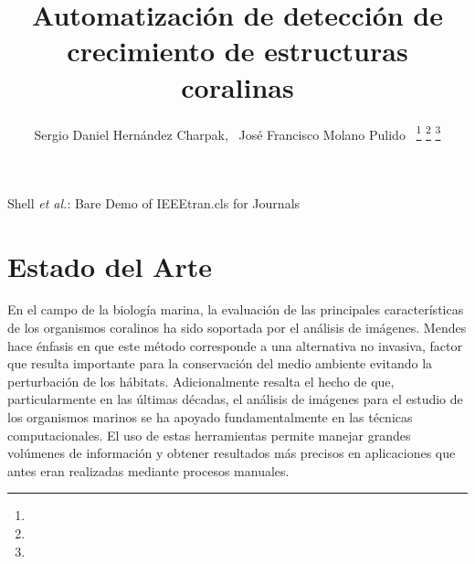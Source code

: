 \documentclass[journal]{IEEEtran}
\begin{document}
\title{Automatización de detección de crecimiento de estructuras coralinas}

\author{Sergio Daniel Hernández Charpak,~\IEEEmembership{}
        José Francisco Molano Pulido~\IEEEmembership{}%
\thanks{}%
\thanks{}%
\thanks{}}

%
{Shell \MakeLowercase{\textit{et al.}}: Bare Demo of IEEEtran.cls for Journals}

\maketitle




\IEEEpeerreviewmaketitle

\section{Estado del Arte}
En el campo de la biología marina, la evaluación de las principales características de
los organismos coralinos ha sido soportada por el análisis de imágenes. Mendes
\cite{estrellas} hace énfasis en que este método corresponde a una alternativa no
invasiva, factor que resulta importante para la conservación del medio ambiente evitando
la perturbación de los hábitats. Adicionalmente resalta el hecho de que, particularmente
en las últimas décadas, el análisis de imágenes para el estudio de los organismos marinos
se ha apoyado fundamentalmente en las técnicas computacionales. El uso de estas
herramientas permite manejar grandes volúmenes de información y obtener resultados más
precisos en aplicaciones que antes eran realizadas mediante procesos manuales. \\
\end{document}
